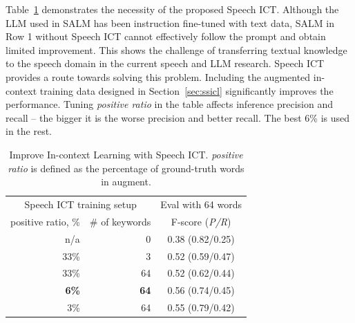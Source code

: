\documentclass{article}
\begin{document}
Table~\ref{tab:exp-wb-sict} demonstrates the necessity  of the proposed Speech ICT. 
Although the LLM used in SALM has been instruction fine-tuned with text data, SALM in Row 1 without Speech ICT cannot effectively follow the prompt and obtain limited improvement. This shows the challenge of transferring textual knowledge to the speech domain in the current speech and LLM research.   
Speech ICT provides a route towards solving this problem. Including the augmented in-context training data designed in Section~\ref{sec:ssicl} significantly improves the performance. Tuning {\em positive ratio} in the table affects inference precision and recall -- the bigger it is the worse precision and better recall.
The best 6\% is used in the rest. 

\begin{table}[]
\centering
\caption{\label{tab:exp-wb-sict} {Improve In-context Learning with  Speech ICT. {\em positive ratio} is defined as the percentage of  ground-truth words in augment.}}
\begin{tabular}{r  r  c}
\toprule
\multicolumn{2}{c}{Speech ICT training setup}               & Eval with 64 words \\
\multicolumn{1}{l}{positive ratio, \%}            & \multicolumn{1}{l}{\# of keywords} & F-score ({\em P/R})      \\
\midrule
n/a                                           & 0                                  & 0.38 (0.82/0.25)   \\
\midrule
33\%                                          & 3                                  & 0.52 (0.59/0.47)   \\
33\%                                          & 64                                 & 0.52 (0.62/0.44)   \\
 \textbf{6\%}                                           & \textbf{64}                                 & 0.56 (0.74/0.45)   \\
3\%                                           & 64                                 & 0.55 (0.79/0.42)  \\
\bottomrule
\end{tabular}
\end{table}
\end{document}
